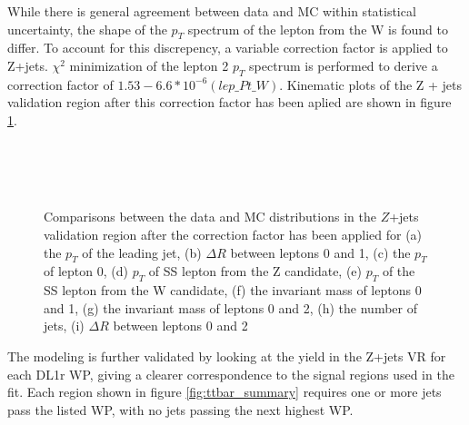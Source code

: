 While there is general agreement between data and MC within statistical uncertainty, the shape of the $p_T$ spectrum of the lepton from the W is found to differ. To account for this discrepency, a variable correction factor is applied to Z+jets. $\chi^2$ minimization of the lepton 2 $p_T$ spectrum is performed to derive a correction factor of $1.53 - 6.6*10^{-6} (lep\_Pt\_W)$. Kinematic plots of the Z + jets validation region after this correction factor has been aplied are shown in figure \ref{fig:zjets_withScale}.

\begin{figure}[H]
    \\
    \\                                 
    \\
    \caption{Comparisons between the data and MC distributions in the $Z$+jets validation region after the correction factor has been applied for (a) the $p_T$ of the leading jet, (b) $\Delta R$ between leptons 0 and 1, (c) the $p_T$ of lepton 0, (d) $p_T$ of SS lepton from the Z candidate, (e) $p_T$ of the SS lepton from the W candidate, (f) the invariant mass of leptons 0 and 1, (g) the invariant mass of leptons 0 and 2, (h) the number of jets, (i) $\Delta R$ between leptons 0 and 2}%
    \label{fig:zjets_withScale}
\end{figure}

The modeling is further validated by looking at the yield in the Z+jets VR for each DL1r WP, giving a clearer correspondence to the signal regions used in the fit. Each region shown in figure \ref{fig:ttbar_summary} requires one or more jets pass the listed WP, with no jets passing the next highest WP.                                                                    

